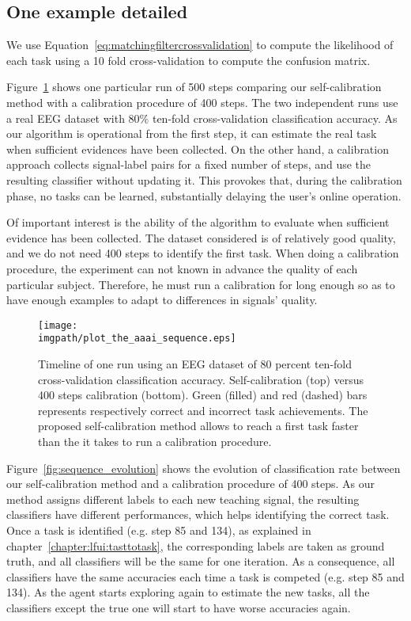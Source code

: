 \subsection{One example detailed}

We use Equation~\ref{eq:matchingfiltercrossvalidation} to compute the likelihood of each task using a 10 fold cross-validation to compute the confusion matrix.

Figure~\ref{fig:sequence} shows one particular run of 500 steps comparing our self-calibration method with a calibration procedure of 400 steps. The two independent runs use a real EEG dataset with $80\%$ ten-fold cross-validation classification accuracy. As our algorithm is operational from the first step, it can estimate the real task when sufficient evidences have been collected. On the other hand, a calibration approach collects signal-label pairs for a fixed number of steps, and use the resulting classifier without updating it. This provokes that, during the calibration phase, no tasks can be learned, substantially delaying the user's online operation. 

Of important interest is the ability of the algorithm to evaluate when sufficient evidence has been collected. The dataset considered is of relatively good quality, and we do not need 400 steps to identify the first task. When doing a calibration procedure, the experiment can not known in advance the quality of each particular subject. Therefore, he must run a calibration for long enough so as to have enough examples to adapt to differences in signals' quality. 


\begin{figure}[!htbp]
\centering
\texttt{[image: \\imgpath/plot\_the\_aaai\_sequence.eps]}
\caption{Timeline of one run using an EEG dataset of $80$ percent ten-fold cross-validation classification accuracy. Self-calibration (top) versus 400 steps calibration (bottom). Green (filled) and red (dashed) bars represents respectively correct and incorrect task achievements. The proposed self-calibration method allows to reach a first task faster than the it takes to run a calibration procedure.}
\label{fig:sequence}
\end{figure} 

Figure~\ref{fig:sequence_evolution} shows the evolution of classification rate between our self-calibration method and a calibration procedure of 400 steps. As our method assigns different labels to each new teaching signal, the resulting classifiers have different performances, which helps identifying the correct task. Once a task is identified (e.g. step 85 and 134), as explained in chapter~\ref{chapter:lfui:tasttotask}, the corresponding labels are taken as ground truth, and all classifiers will be the same for one iteration. As a consequence, all classifiers have the same accuracies each time a task is competed (e.g. step 85 and 134). As the agent starts exploring again to estimate the new tasks, all the classifiers except the true one will start to have worse accuracies again.

